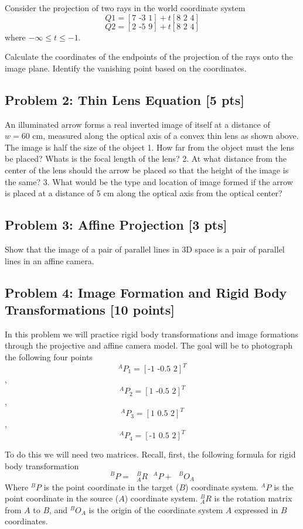 \documentclass[11pt]{article}
\begin{document}
Consider the projection of two rays in the world coordinate system \[
Q1 = [\text{7 -3 1}] + t[\text{8 2 4}]
\] \[
Q2 = [\text{2 -5 9}] + t[\text{8 2 4}]
\] where \(-\infty \leq t \leq -1\).

Calculate the coordinates of the endpoints of the projection of the rays
onto the image plane. Identify the vanishing point based on the
coordinates.

    \subsection{Problem 2: Thin Lens Equation {[}5
pts{]}}\label{problem-2-thin-lens-equation-5-pts}

An illuminated arrow forms a real inverted image of itself at a distance
of \(w = 60\text{ cm}\), measured along the optical axis of a convex
thin lens as shown above. The image is half the size of the object 1.
How far from the object must the lens be placed? Whats is the focal
length of the lens? 2. At what distance from the center of the lens
should the arrow be placed so that the height of the image is the same?
3. What would be the type and location of image formed if the arrow is
placed at a distance of 5 cm along the optical axis from the optical
center?

    \subsection{Problem 3: Affine Projection {[}3
pts{]}}\label{problem-3-affine-projection-3-pts}

Show that the image of a pair of parallel lines in 3D space is a pair of
parallel lines in an affine camera.

    \subsection{Problem 4: Image Formation and Rigid Body Transformations
{[}10
points{]}}\label{problem-4-image-formation-and-rigid-body-transformations-10-points}

In this problem we will practice rigid body transformations and image
formations through the projective and affine camera model. The goal will
be to photograph the following four points
\[^AP_1 = [\text{-1 -0.5 2}]^T\], \[^AP_2 = [\text{1 -0.5 2}]^T\],
\[^AP_3 = [\text{1 0.5 2}]^T\], \[^AP_4 = [\text{-1 0.5 2}]^T\]

To do this we will need two matrices. Recall, first, the following
formula for rigid body transformation \[
^BP = \text{ } ^B_AR\text{ }^AP + \text{ } ^BO_A
\] Where \(^BP\) is the point coordinate in the target (\(B\))
coordinate system. \(^AP\) is the point coordinate in the source (\(A\))
coordinate system. \(^B_AR\) is the rotation matrix from \(A\) to \(B\),
and \(^BO_A\) is the origin of the coordinate system \(A\) expressed in
\(B\) coordinates.
\end{document}
